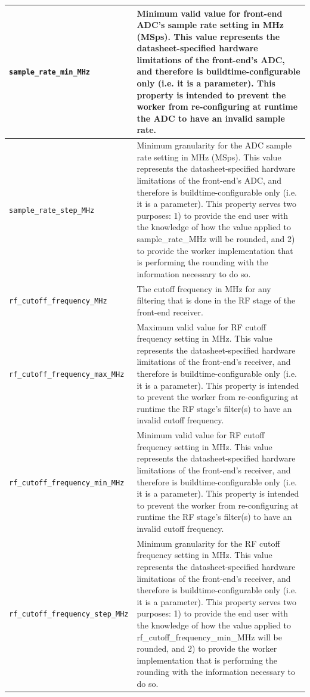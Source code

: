 \begin{longtable}{|p{5cm}|p{12cm}|}
			\hline
			\verb+sample_rate_min_MHz+          & Minimum valid value for front-end ADC's sample rate setting in MHz (MSps). This value represents the datasheet-specified hardware limitations of the front-end's ADC, and therefore is buildtime-configurable only (i.e. it is a parameter). This property is intended to prevent the worker from re-configuring at runtime the ADC to have an invalid sample rate. \\
			\hline
			\verb+sample_rate_step_MHz+         & Minimum granularity for the ADC sample rate setting in MHz (MSps). This value represents the datasheet-specified hardware limitations of the front-end's ADC, and therefore is buildtime-configurable only (i.e. it is a parameter). This property serves two purposes: 1) to provide the end user with the knowledge of how the value applied to sample\_rate\_MHz will be rounded, and 2) to provide the worker implementation that is performing the rounding with the information necessary to do so. \\
			\hline
			\verb+rf_cutoff_frequency_MHz+      & The cutoff frequency in MHz for any filtering that is done in the RF stage of the front-end receiver. \\
			\hline
			\verb+rf_cutoff_frequency_max_MHz+  & Maximum valid value for RF cutoff frequency setting in MHz. This value represents the datasheet-specified hardware limitations of the front-end's receiver, and therefore is buildtime-configurable only (i.e. it is a parameter). This property is intended to prevent the worker from re-configuring at runtime the RF stage's filter(s) to have an invalid cutoff frequency. \\
			\hline
			\verb+rf_cutoff_frequency_min_MHz+  & Minimum valid value for RF cutoff frequency setting in MHz. This value represents the datasheet-specified hardware limitations of the front-end's receiver, and therefore is buildtime-configurable only (i.e. it is a parameter). This property is intended to prevent the worker from re-configuring at runtime the RF stage's filter(s) to have an invalid cutoff frequency. \\
			\hline
			\verb+rf_cutoff_frequency_step_MHz+ & Minimum granularity for the RF cutoff frequency setting in MHz. This value represents the datasheet-specified hardware limitations of the front-end's receiver, and therefore is buildtime-configurable only (i.e. it is a parameter). This property serves two purposes: 1) to provide the end user with the knowledge of how the value applied to rf\_cutoff\_frequency\_min\_MHz will be rounded, and 2) to provide the worker implementation that is performing the rounding with the information necessary to do so. \\

\end{longtable}
